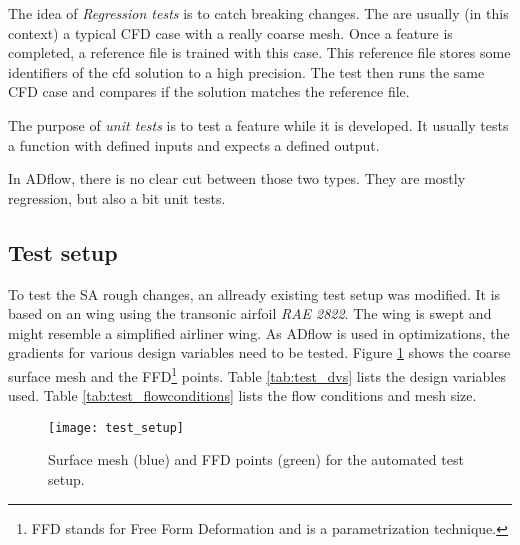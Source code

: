 The idea of \textit{Regression tests} is to catch breaking changes. The are
usually (in this context) a typical CFD case with a really coarse mesh. Once a
feature is completed, a reference file is trained with this case. This reference
file stores some identifiers of the cfd solution to a high precision. The test
then runs the same CFD case and compares if the solution matches the reference
file.

The purpose of \textit{unit tests} is to test a feature while it is developed.
It usually tests a function with defined inputs and expects a defined output.

In ADflow, there is no clear cut between those two types. They are mostly
regression, but also a bit unit tests.

\subsection{Test setup}
To test the SA rough changes, an allready existing test setup was modified. It
is based on an wing using the transonic airfoil \textit{RAE 2822}. The wing is
swept and might resemble a simplified airliner wing. As ADflow is used in
optimizations, the gradients for various design variables need to be tested.
Figure \ref{fig:test_setup} shows the coarse surface mesh and the
FFD\footnote{FFD stands for Free Form Deformation and is a parametrization
technique.} points. Table \ref{tab:test_dvs} lists the design variables used.
Table \ref{tab:test_flowconditions} lists the flow conditions and mesh size.

\begin{figure}[H] \centering
  \texttt{[image: test\_setup]}
  \caption{Surface mesh (blue) and FFD points (green) for the automated test setup.}
  \label{fig:test_setup}
\end{figure}


